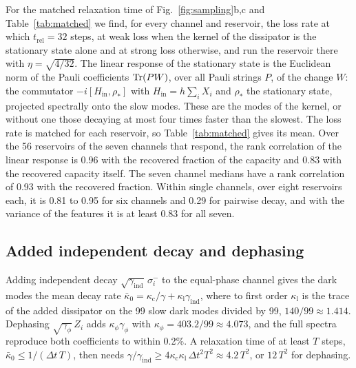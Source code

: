 For the matched relaxation time of Fig.~\ref{fig:sampling}b,c and Table~\ref{tab:matched} we find, for every channel
and reservoir, the loss rate at which $t_{\mathrm{rel}}=32$ steps, at weak loss when the kernel of the dissipator is
the stationary state alone and at strong loss otherwise, and run the reservoir there with $\eta=\sqrt{4/32}$. The
linear response of the stationary state is the Euclidean norm of the Pauli
coefficients $\operatorname{Tr}(PW)$, over all Pauli strings $P$, of the change $W$: the commutator $-i[H_{\mathrm{in}},\rho_*]$ with
$H_{\mathrm{in}}=h\sum_iX_i$ and $\rho_*$ the stationary state, projected spectrally onto the slow modes. These are the
modes of the kernel, or without one those decaying at most four times faster than the slowest. The loss
rate is matched for each reservoir, so Table~\ref{tab:matched} gives its mean. Over the 56 reservoirs of the seven channels that respond, the rank correlation of the linear response is 0.96 with
the recovered fraction of the capacity and 0.83 with the recovered capacity itself. The seven channel medians have a
rank correlation of 0.93 with the recovered fraction. Within single channels, over eight reservoirs each, it is 0.81
to 0.95 for six channels and 0.29 for pairwise decay, and with the variance of the features it is at least 0.83 for
all seven.

\subsection{Added independent decay and dephasing}
\label{app:num-noise}
Adding independent decay $\sqrt{\gamma_{\mathrm{ind}}}\,\sigma_i^-$ to the equal-phase channel gives the dark modes
the mean decay rate $\bar\kappa_0=\kappa_{\mathrm c}/\gamma+\kappa_{\mathrm l}\gamma_{\mathrm{ind}}$, where to first
order $\kappa_{\mathrm l}$ is the trace of the added dissipator on the 99 slow dark modes divided by 99,
$140/99\approx1.414$. Dephasing $\sqrt{\gamma_\phi}\,Z_i$ adds $\kappa_\phi\gamma_\phi$ with
$\kappa_\phi=403.2/99\approx4.073$, and the full spectra reproduce both coefficients to within 0.2\%. A relaxation
time of at least $T$ steps, $\bar\kappa_0\le1/(\Delta t\,T)$, then needs
$\gamma/\gamma_{\mathrm{ind}}\ge4\kappa_{\mathrm c}\kappa_{\mathrm l}\,\Delta t^2T^2\approx4.2\,T^2$, or $12\,T^2$ for
dephasing.

